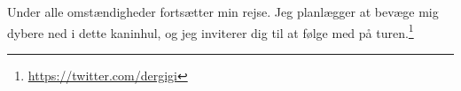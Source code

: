 Under alle omstændigheder fortsætter min rejse. Jeg planlægger at bevæge mig 
dybere ned i dette kaninhul, og jeg inviterer dig til at følge med
på turen.\footnote{\url{https://twitter.com/dergigi}}

%
